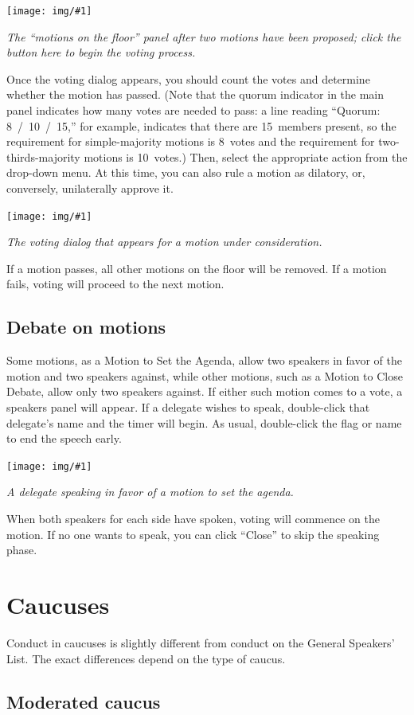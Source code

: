 \documentclass{article}
\newcommand{\encouragebreak}[1]{\vfil\penalty-#1\vfilneg}
\newcommand{\img}[2]{%
  \begin{center}
    \vspace{6pt}
    \encouragebreak{100}
    \centerline{\texttt{[image: img/\#1]}}
    {\slshape #2}
    \encouragebreak{300}
  \end{center}
}
\begin{document}
\img{motions_on_floor}{The ``motions on the floor'' panel after two motions have been proposed; click the button here to begin the voting process.}

Once the voting dialog appears, you should count the votes and determine whether the motion has passed.
(Note that the quorum indicator in the main panel indicates how many votes are needed to pass: a line reading ``Quorum: 8~/~10~/~15,'' for example, indicates that there are 15~members present, so the requirement for simple-majority motions is 8~votes and the requirement for two-thirds-majority motions is 10~votes.)
Then, select the appropriate action from the drop-down menu.
At this time, you can also rule a motion as dilatory, or, conversely, unilaterally approve it.
\img{vote_on_motion}{The voting dialog that appears for a motion under consideration.}

If a motion passes, all other motions on the floor will be removed.
If a motion fails, voting will proceed to the next motion.

\subsection{Debate on motions}

Some motions, as a Motion to Set the Agenda, allow two speakers in favor of the motion and two speakers against, while other motions, such as a Motion to Close Debate, allow only two speakers against.
If either such motion comes to a vote, a speakers panel will appear.
If a delegate wishes to speak, double-click that delegate's name and the timer will begin.
As usual, double-click the flag or name to end the speech early.

\img{speak_for_motion}{A delegate speaking in favor of a motion to set the agenda.}

When both speakers for each side have spoken, voting will commence on the motion.
If no one wants to speak, you can click ``Close'' to skip the speaking phase.

\section{Caucuses}

Conduct in caucuses is slightly different from conduct on the General Speakers' List.
The exact differences depend on the type of caucus.

\subsection{Moderated caucus}
\end{document}
